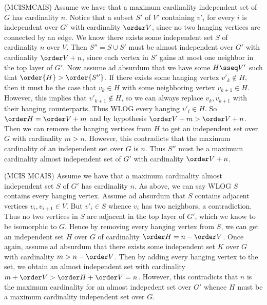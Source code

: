 \documentclass{article}
\begin{document}
\begin{solution}
  \begin{subproof}[Correctness.]
    (MCIS\imp MCAIS)
    Assume we have that a maximum cardinality independent set of \( G \) has cardinality \( n \).
    Notice that a subset \( S' \) of \( V' \) containing \( v'_i \) for every \( i \) is independent over \( G' \) with cardinality \( \order V \), since no two hanging vertices are connected by an edge.
    We know there exists some independent set \( S \) of cardinality \( n \) over \( V \).
    Then \( S'' = S\cup S' \) must be almost independent over \( G' \) with cardinality \( \order V + n \), since each vertex in \( S' \) gains at most one neighbor in the top layer of \( G' \).
    Now assume ad absurdum that we have some \( H\sseq V' \) such that \( \order{H} > \order{S''} \).
    If there exists some hanging vertex \( v'_k\not\in H \), then it must be the case that \( v_k\in H \) with some neighboring vertex \( v_{k+1}\in H \).
    However, this implies that \( v'_{k+1}\not\in H \), so we can always replace \( v_k,v_{k+1} \) with their hanging counterparts.
    Thus WLOG every hanging \( v'_i\in H \).
    So \( \order H = \order V + m \) and by hypothesis \( \order V + m > \order V + n \).
    Then we can remove the hanging vertices from \( H \) to get an independent set over \( G \) with cardinality \( m > n \).
    However, this contradicts that the maximum cardinality of an independent set over \( G \) is \( n \).
    Thus \( S'' \) must be a maximum cardinality almost independent set of \( G' \) with cardinality \( \order V + n \).

    (MCIS \pmi MCAIS)
    Assume we have that a maximum cardinality almost independent set \( S \) of \( G' \) has cardinality \( n \).
    As above, we can say WLOG \( S \) contains every hanging vertex.
    Assume ad absurdum that \( S \) contains adjacent vertices \( v_i,v_{i+1} \in V \).
    But \( v'_i \in S \) whence \( v_i \) has two neighbors, a contradiction.
    Thus no two vertices in \( S \) are adjacent in the top layer of \( G' \), which we know to be isomorphic to \( G \).
    Hence by removing every hanging vertex from \( S \), we can get an independent set \( H \) over \( G \) of cardinality \( \order H = n - \order V \).
    Once again, assume ad absurdum that there exists some independent set \( K \) over \( G \) with cardinality \( m > n-\order V \).
    Then by adding every hanging vertex to the set, we obtain an almost independent set with cardinality \( m+\order V > \order H + \order V = n \).
    However, this contradicts that \( n \) is the maximum cardinality for an almost indepedent set over \( G' \) whence \( H \) must be a maximum cardinality independent set over \( G \).
  \end{subproof}
\end{solution}
\pagebreak
\end{document}
